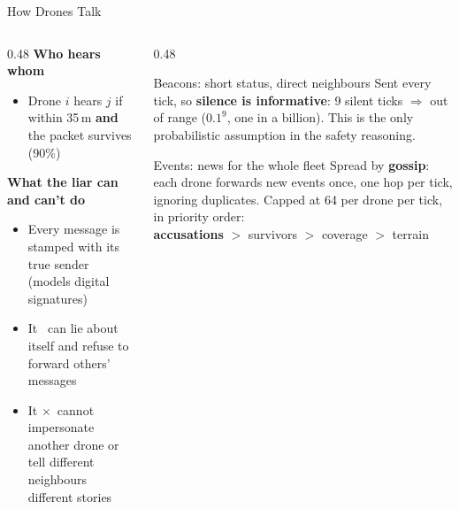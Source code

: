 \documentclass[aspectratio=169,10pt]{beamer}
\newcommand{\yes}{\textcolor{good}{\checkmark}}
\newcommand{\no}{\textcolor{bad}{$\times$}}
\begin{document}
\begin{frame}{How Drones Talk}
\begin{columns}[T]
\begin{column}{0.48\textwidth}
\textbf{Who hears whom}
\begin{itemize}\small
  \item Drone $i$ hears $j$ if within 35\,m \textbf{and} the packet survives (90\%)
\end{itemize}
\vspace{0.3em}
\textbf{What the liar can and can't do}
\begin{itemize}\small
  \item Every message is stamped with its true sender (models digital signatures)
  \item It \yes\ can lie about itself and refuse to forward others' messages
  \item It \no\ cannot impersonate another drone or tell different neighbours different stories
\end{itemize}
\end{column}
\begin{column}{0.48\textwidth}
\begin{block}{Beacons: short status, direct neighbours}
\small Sent every tick, so \textbf{silence is informative}: 9 silent ticks $\Rightarrow$ out of range ($0.1^9$, one in a billion). This is the only probabilistic assumption in the safety reasoning.
\end{block}
\vspace{0.2em}
\begin{block}{Events: news for the whole fleet}
\small Spread by \textbf{gossip}: each drone forwards new events once, one hop per tick, ignoring duplicates. Capped at 64 per drone per tick, in priority order:\\
\textbf{accusations} $>$ survivors $>$ coverage $>$ terrain
\end{block}
\end{column}
\end{columns}
\end{frame}
\end{document}
